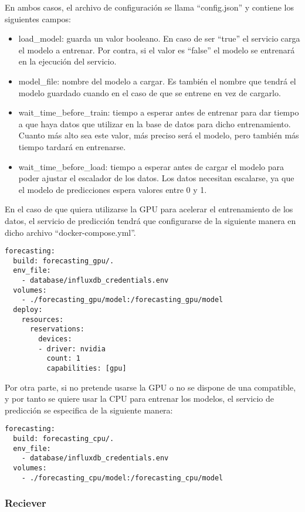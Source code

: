 En ambos casos, el archivo de configuración se llama ``config.json'' y contiene los siguientes campos:
\begin{itemize}
    \item load\_model: guarda un valor booleano. En caso de ser ``true'' el servicio carga el modelo a entrenar.
        Por contra, si el valor es ``false'' el modelo se entrenará en la ejecución del servicio.
    \item model\_file: nombre del modelo a cargar. Es también el nombre que tendrá el modelo guardado cuando 
        en el caso de que se entrene en vez de cargarlo.
    \item wait\_time\_before\_train: tiempo a esperar antes de entrenar para dar tiempo a que haya datos que 
        utilizar en la base de datos para dicho entrenamiento. Cuanto más alto sea este valor, más preciso será 
        el modelo, pero también más tiempo tardará en entrenarse.
    \item wait\_time\_before\_load: tiempo a esperar antes de cargar el modelo para poder ajustar el escalador de los
        datos. Los datos necesitan escalarse, ya que el modelo de predicciones espera valores entre 0 y 1.
\end{itemize}

En el caso de que quiera utilizarse la GPU para acelerar el entrenamiento de los datos, el servicio de predicción tendrá 
que configurarse de la siguiente manera en dicho archivo ``docker-compose.yml''.
\begin{lstlisting}
forecasting:
  build: forecasting_gpu/.
  env_file:
    - database/influxdb_credentials.env
  volumes:
    - ./forecasting_gpu/model:/forecasting_gpu/model
  deploy:
    resources:
      reservations:
        devices:
        - driver: nvidia
          count: 1
          capabilities: [gpu]
\end{lstlisting}

Por otra parte, si no pretende usarse la GPU o no se dispone de una compatible, y por tanto se quiere usar la 
CPU para entrenar los modelos, el servicio de predicción se especifica de la siguiente manera:
\begin{lstlisting}
forecasting:
  build: forecasting_cpu/.
  env_file:
    - database/influxdb_credentials.env
  volumes:
    - ./forecasting_cpu/model:/forecasting_cpu/model
\end{lstlisting}

\subsubsection{Reciever}

